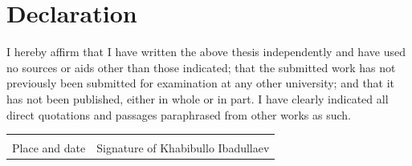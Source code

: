 \chapter*{Declaration}
{}

I hereby affirm that I have written the above thesis independently and have
used no sources or aids other than those indicated; that the submitted work
has not previously been submitted for examination at any other university;
and that it has not been published, either in whole or in part. I have clearly
indicated all direct quotations and passages paraphrased from other works
as such.

\vspace{2cm}
\noindent\begin{tabular}{@{}p{5cm}p{6.5cm}@{}}
\hrulefill & \hrulefill \\
Place and date & Signature of Khabibullo Ibadullaev
\end{tabular}
